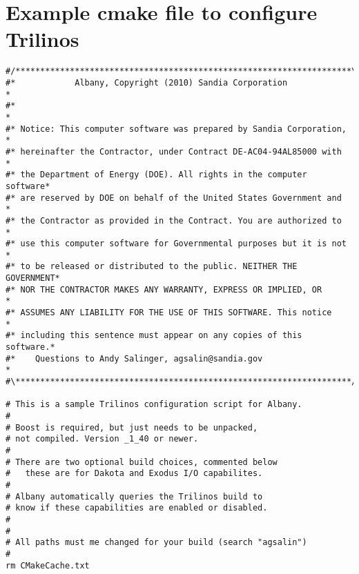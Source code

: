 \documentclass[pdf,12pt,report,strict]{SANDreport}
\theoremstyle{remark}
\begin{document}
\section{Example cmake file to configure Trilinos}
\begin{verbatim}
#/********************************************************************\
#*            Albany, Copyright (2010) Sandia Corporation             *
#*                                                                    *
#* Notice: This computer software was prepared by Sandia Corporation, *
#* hereinafter the Contractor, under Contract DE-AC04-94AL85000 with  *
#* the Department of Energy (DOE). All rights in the computer software*
#* are reserved by DOE on behalf of the United States Government and  *
#* the Contractor as provided in the Contract. You are authorized to  *
#* use this computer software for Governmental purposes but it is not *
#* to be released or distributed to the public. NEITHER THE GOVERNMENT*
#* NOR THE CONTRACTOR MAKES ANY WARRANTY, EXPRESS OR IMPLIED, OR      *
#* ASSUMES ANY LIABILITY FOR THE USE OF THIS SOFTWARE. This notice    *
#* including this sentence must appear on any copies of this software.*
#*    Questions to Andy Salinger, agsalin@sandia.gov                  *
#\********************************************************************/

# This is a sample Trilinos configuration script for Albany.
#
# Boost is required, but just needs to be unpacked,
# not compiled. Version _1_40 or newer.
#
# There are two optional build choices, commented below
#   these are for Dakota and Exodus I/O capabilites.
#
# Albany automatically queries the Trilinos build to 
# know if these capabilities are enabled or disabled.
#
#
# All paths must me changed for your build (search "agsalin")
#
rm CMakeCache.txt


\end{verbatim}
\end{document}
